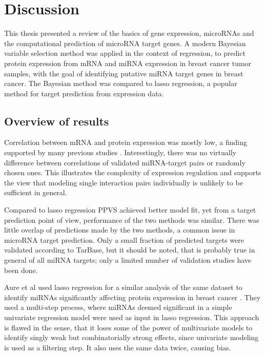 
\section{Discussion}

This thesis presented a review of the basics of gene expression, microRNAs and
the computational prediction of microRNA target genes. A modern Bayesian
variable selection method was applied in the context of regression, to predict
protein expression from mRNA and miRNA expression in breast cancer tumor
samples, with the goal of identifying putative miRNA target genes in breast
cancer. The Bayesian method was compared to lasso regression, a popular method
for target prediction from expression data.


\subsection*{Overview of results}

Correlation between mRNA and protein expression was mostly low, a finding
supported by many previous studies \citep{Payne2015}. Interestingly, there was
no virtually difference between correlations of validated miRNA-target pairs
or randomly chosen ones. This illustrates the complexity of expression
regulation and supports the view that modeling single interaction pairs
individually is unlikely to be sufficient in general.

Compared to lasso regression PPVS achieved better model fit, yet from a target
prediction point of view, performance of the two methods was similar.
There was little overlap of predictions made by the two methods, a common
issue in microRNA target prediction. Only a small fraction of predicted
targets were validated according to TarBase, but it should be noted, that is
probably true in general of all miRNA targets; only a limited number of
validation studies have been done.

Aure et al used lasso regression for a similar analysis of the same dataset
to identify miRNAs significantly affecting protein expression in breast cancer
\citep{Aure2015}. They used a multi-step process, where miRNAs deemed
significant in a simple univariate regression model were used as input in
lasso regression. This approach is flawed in the sense, that it loses some of
the power of multivariate models to identify singly weak but combinatorially
strong effects, since univariate modeling is used as a filtering step. It also
uses the same data twice, causing bias.


